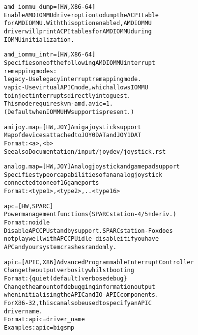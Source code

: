 \documentclass[a4paper,8pt,english]{sphinxmanual}
\begin{document}
\begin{alltt}
        amd\_iommu\_dump= {[}HW,X86-64{]}
                        Enable AMD IOMMU driver option to dump the ACPI table
                        for AMD IOMMU. With this option enabled, AMD IOMMU
                        driver will print ACPI tables for AMD IOMMU during
                        IOMMU initialization.

        amd\_iommu\_intr= {[}HW,X86-64{]}
                        Specifies one of the following AMD IOMMU interrupt
                        remapping modes:
                        legacy     - Use legacy interrupt remapping mode.
                        vapic      - Use virtual APIC mode, which allows IOMMU
                                     to inject interrupts directly into guest.
                                     This mode requires kvm-amd.avic=1.
                                     (Default when IOMMU HW support is present.)

        amijoy.map=     {[}HW,JOY{]} Amiga joystick support
                        Map of devices attached to JOY0DAT and JOY1DAT
                        Format: \textless{}a\textgreater{},\textless{}b\textgreater{}
                        See also Documentation/input/joydev/joystick.rst

        analog.map=     {[}HW,JOY{]} Analog joystick and gamepad support
                        Specifies type or capabilities of an analog joystick
                        connected to one of 16 gameports
                        Format: \textless{}type1\textgreater{},\textless{}type2\textgreater{},..\textless{}type16\textgreater{}

        apc=            {[}HW,SPARC{]}
                        Power management functions (SPARCstation-4/5 + deriv.)
                        Format: noidle
                        Disable APC CPU standby support. SPARCstation-Fox does
                        not play well with APC CPU idle - disable it if you have
                        APC and your system crashes randomly.

        apic=           {[}APIC,X86{]} Advanced Programmable Interrupt Controller
                        Change the output verbosity whilst booting
                        Format: \{ quiet (default) \textbar{} verbose \textbar{} debug \}
                        Change the amount of debugging information output
                        when initialising the APIC and IO-APIC components.
                        For X86-32, this can also be used to specify an APIC
                        driver name.
                        Format: apic=driver\_name
                        Examples: apic=bigsmp


\end{alltt}
\end{document}
